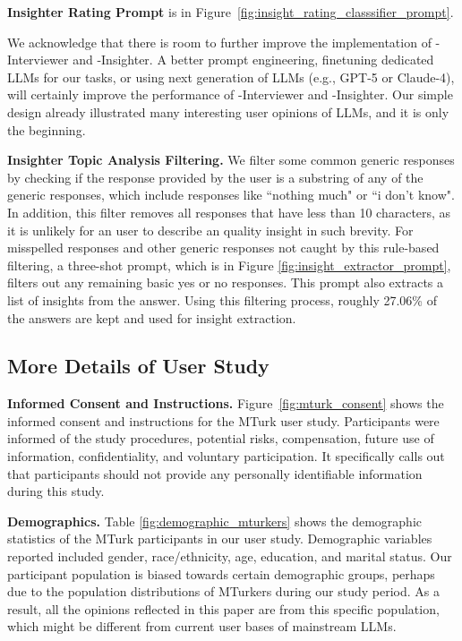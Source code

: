\textbf{Insighter Rating Prompt }is in Figure~\ref{fig:insight_rating_classsifier_prompt}. 

We acknowledge that there is room to further improve the implementation of \method-Interviewer and \method-Insighter. A better prompt engineering, finetuning dedicated LLMs for our tasks, or using next generation of LLMs (e.g., GPT-5 or Claude-4), will certainly improve the performance of \method-Interviewer and \method-Insighter. Our simple design already illustrated many interesting user opinions of LLMs, and it is only the beginning.




\textbf{Insighter Topic Analysis Filtering.} We filter some common generic responses by checking if the response provided by the user is a substring of any of the generic responses, which include responses like ``nothing much" or ``i don't know". In addition, this filter removes all responses that have less than 10 characters, as it is unlikely for an user to describe an quality insight in such brevity. For misspelled responses and other generic responses not caught by this rule-based filtering, a three-shot prompt, which is in Figure \ref{fig:insight_extractor_prompt}, filters out any remaining basic yes or no responses. This prompt also extracts a list of insights from the answer. Using this filtering process, roughly 27.06\% of the answers are kept and used for insight extraction.


\subsection{More Details of User Study}
\label{app.user_study}


\textbf{Informed Consent and Instructions.} Figure~\ref{fig:mturk_consent} shows the informed consent and instructions for the MTurk user study. Participants were informed of the study procedures, potential risks, compensation, future use of information, confidentiality, and voluntary participation. It specifically calls out that participants should not provide any personally identifiable information during this study.



\textbf{Demographics.} Table \ref{fig:demographic_mturkers} shows the demographic statistics of the MTurk participants in our user study. Demographic variables reported included gender, race/ethnicity, age, education, and marital status. 
Our participant population is biased towards certain demographic groups, perhaps due to the population distributions of MTurkers during our study period. As a result, all the opinions reflected in this paper are from this specific population, which might be different from current user bases of mainstream LLMs.

